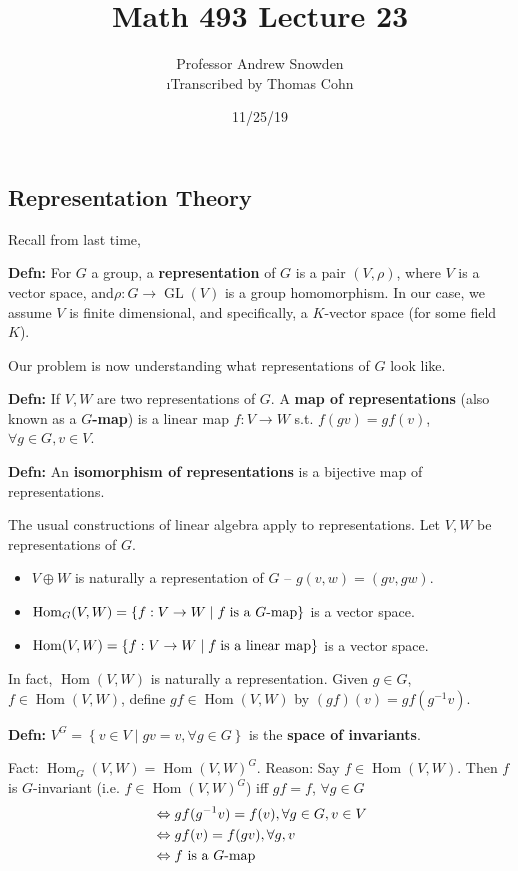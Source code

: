\documentclass[10pt,letterpaper]{article}
\author{Professor Andrew Snowden\\ \small\i{Transcribed by Thomas Cohn}}
\title{Math 493 Lecture 23}
\date{11/25/19} %
\newcommand{\n}{\hfill\break}
\newcommand{\hangblock}[2]{\par\noindent\settowidth{\hangindent}{\textbf{#1: }}\textbf{#1: }\!\!\!#2}
\newcommand{\defn}[1]{\hangblock{Defn}{#1}}
\newcommand{\ptxt}[1]{\textrm{\textnormal{#1}}}
\newcommand{\set}[1]{\left\{#1\right\}}
\DeclareMathOperator{\Hom}{Hom}
\newcommand{\inv}{^{-1}}
\DeclareMathOperator{\GL}{GL}
\newcommand{\st}{s.t.}
\begin{document}
\maketitle
\setlength\RaggedRightParindent{\parindent}
\RaggedRight

\subsection*{Representation Theory}

\par\noindent
Recall from last time,\n

\defn{
	For $G$ a group, a \textbf{representation} of $G$ is a pair $(V,\rho)$, where $V$ is a vector space, and\break $\rho:G\to\GL(V)$ is a group homomorphism. In our case, we assume $V$ is finite dimensional, and specifically, a $K$-vector space (for some field $K$).\n
}

\par\noindent
Our problem is now understanding what representations of $G$ look like.\n

\defn{
	If $V,W$ are two representations of $G$. A \textbf{map of representations} (also known as a \textbf{$G$-map}) is a linear map $f:V\to{}W$ \st{} $f(gv)=gf(v)$, $\forall{}g\in{}G,v\in{}V$.\n
}

\defn{
	An \textbf{isomorphism of representations} is a bijective map of representations.\n
}

\par\noindent
The usual constructions of linear algebra apply to representations. Let $V,W$ be representations of $G$.
\begin{itemize}
	\item $V\oplus{}W$ is naturally a representation of $G$ -- $g(v,w)=(gv,gw)$.
	\item $\Hom_{G}(V,W)=\set{f:V\to{}W\mid{}f\;\ptxt{is a $G$-map}}$ is a vector space.
	\item $\Hom(V,W)=\set{f:V\to{}W\mid{}f\;\ptxt{is a linear map}}$ is a vector space.
\end{itemize}

\par\noindent
In fact, $\Hom(V,W)$ is naturally a representation. Given $g\in{}G$, $f\in\Hom(V,W)$, define $gf\in\Hom(V,W)$ by $(gf)(v)=gf(g\inv{}v)$.\n

\defn{
	$V^{G}=\set{v\in{}V\mid{}gv=v,\forall{}g\in{}G}$ is the \textbf{space of invariants}.\n
}

\par\noindent
Fact: $\Hom_{G}(V,W)=\Hom(V,W)^{G}$.\n
Reason: Say $f\in\Hom(V,W)$. Then $f$ is $G$-invariant (i.e. $f\in\Hom(V,W)^{G}$) iff $gf=f$, $\forall{}g\in{}G$
{\setlength{\abovedisplayskip}{0pt}
\begin{align*}
	& \Leftrightarrow{}gf(g\inv{}v)=f(v),\forall{}g\in{}G,v\in{}V\\
	& \Leftrightarrow{}gf(v)=f(gv),\forall{}g,v\\
	& \Leftrightarrow{}f\ptxt{ is a $G$-map}
\end{align*}}
\end{document}

